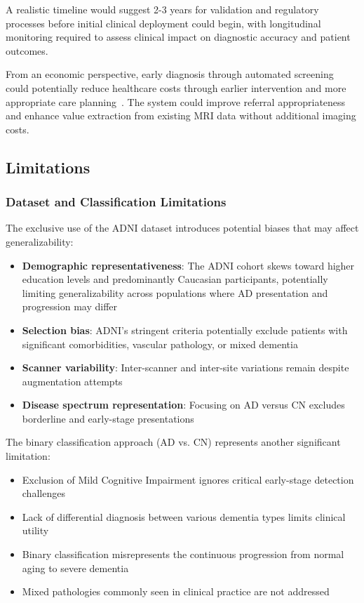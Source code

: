 \documentclass[12pt, a4paper]{article}
\begin{document}
A realistic timeline would suggest 2-3 years for validation and regulatory processes before initial clinical deployment could begin, with longitudinal monitoring required to assess clinical impact on diagnostic accuracy and patient outcomes.

From an economic perspective, early diagnosis through automated screening could potentially reduce healthcare costs through earlier intervention and more appropriate care planning~\cite{jack2018nia}. The system could improve referral appropriateness and enhance value extraction from existing MRI data without additional imaging costs.

\subsection{Limitations}

\subsubsection{Dataset and Classification Limitations}

The exclusive use of the ADNI dataset introduces potential biases that may affect generalizability:

\begin{itemize}
    \item \textbf{Demographic representativeness}: The ADNI cohort skews toward higher education levels and predominantly Caucasian participants, potentially limiting generalizability across populations where AD presentation and progression may differ~\cite{jack2008alzheimer}
    \item \textbf{Selection bias}: ADNI's stringent criteria potentially exclude patients with significant comorbidities, vascular pathology, or mixed dementia~\cite{jack2008alzheimer}
    \item \textbf{Scanner variability}: Inter-scanner and inter-site variations remain despite augmentation attempts
    \item \textbf{Disease spectrum representation}: Focusing on AD versus CN excludes borderline and early-stage presentations
\end{itemize}

The binary classification approach (AD vs. CN) represents another significant limitation:

\begin{itemize}
    \item Exclusion of Mild Cognitive Impairment ignores critical early-stage detection challenges
    \item Lack of differential diagnosis between various dementia types limits clinical utility
    \item Binary classification misrepresents the continuous progression from normal aging to severe dementia
    \item Mixed pathologies commonly seen in clinical practice are not addressed
\end{itemize}
\end{document}
